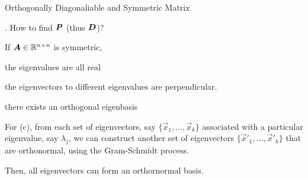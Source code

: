 \documentclass[fleqn,aspectratio=169]{beamer}
\begin{document}
\begin{frame}{Orthogonally Diagonaliable and Symmetric Matrix}

\plitemsep 0.1in

\vspace{0.2cm}
\vspace{-0.3cm}
\bci

\item \question. How to find $\bm{P}$ (thus $\bm{D}$)?

\item {} If $\bm{A} \in {\mathbb R}^{n \times n}$ is symmetric, 
\bce[(a)]
\item the eigenvalues are all real 
\item the eigenvectors to different eigenvalues are perpendicular. 
\item there exists an orthogonal eigenbasis
\ece

\item For (c), from each set of eigenvectors, say $\{\vec{x}_1, \ldots, \vec{x}_k \}$ associated with a particular eigenvalue, say $\lambda_j$, we can construct another set of eigenvectors $\{\vec{x}'_1, \ldots, \vec{x}'_k \}$ that are orthonormal, using the Gram-Schmidt process.  

\item Then, all eigenvectors can form an orthornormal basis. 
\eci

\end{frame}
\end{document}
